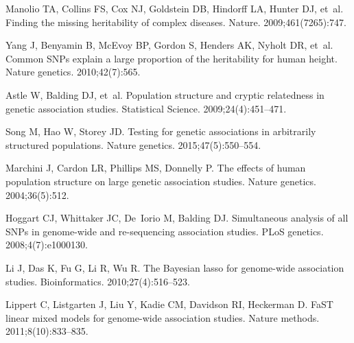 \documentclass[10pt,letterpaper]{article}
\begin{document}
\nolinenumbers

%
%
% 


%

\begin{thebibliography}{10}

	Manolio TA, Collins FS, Cox NJ, Goldstein DB, Hindorff LA, Hunter DJ, et~al.
	\newblock Finding the missing heritability of complex diseases.
	\newblock Nature. 2009;461(7265):747.

	Yang J, Benyamin B, McEvoy BP, Gordon S, Henders AK, Nyholt DR, et~al.
	\newblock Common SNPs explain a large proportion of the heritability for human
	height.
	\newblock Nature genetics. 2010;42(7):565.

	Astle W, Balding DJ, et~al.
	\newblock Population structure and cryptic relatedness in genetic association
	studies.
	\newblock Statistical Science. 2009;24(4):451--471.

	Song M, Hao W, Storey JD.
	\newblock Testing for genetic associations in arbitrarily structured
	populations.
	\newblock Nature genetics. 2015;47(5):550--554.

	Marchini J, Cardon LR, Phillips MS, Donnelly P.
	\newblock The effects of human population structure on large genetic
	association studies.
	\newblock Nature genetics. 2004;36(5):512.

	Hoggart CJ, Whittaker JC, De~Iorio M, Balding DJ.
	\newblock Simultaneous analysis of all SNPs in genome-wide and re-sequencing
	association studies.
	\newblock PLoS genetics. 2008;4(7):e1000130.

	Li J, Das K, Fu G, Li R, Wu R.
	\newblock The Bayesian lasso for genome-wide association studies.
	\newblock Bioinformatics. 2010;27(4):516--523.

	Lippert C, Listgarten J, Liu Y, Kadie CM, Davidson RI, Heckerman D.
	\newblock FaST linear mixed models for genome-wide association studies.
	\newblock Nature methods. 2011;8(10):833--835.


\end{thebibliography}
\end{document}
